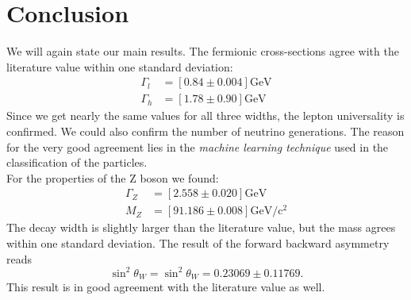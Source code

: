 \section{Conclusion}
We will again state our main results.
The fermionic cross-sections agree with the literature value within one standard deviation:
\begin{align*}
    \Gamma_l &=  \left[ 0.84 \pm 0.004 \right]\mathrm{GeV}\\ 
    \Gamma_h &=  \left[ 1.78 \pm 0.90 \right] \mathrm{GeV}
\end{align*}
Since we get nearly the same values for all three widths, the lepton universality is confirmed. We could also
confirm the number of neutrino generations.
The reason for the very good agreement lies in the \textit{machine learning technique} used in the classification
of the particles. \\
For the properties of the Z boson we found:
\begin{align*}
    \Gamma_Z  &= \left[ 2.558 \pm 0.020 \right] \mathrm{GeV}\\
    M_Z &= \left[ 91.186 \pm 0.008 \right] \mathrm{GeV / c^2} 
\end{align*}
The decay width is slightly larger than the literature value, but the mass agrees within one standard deviation.
The result of the forward backward asymmetry reads
\begin{equation*}
   \sin^2 \theta_W = \sin^2\theta_W = 0.23069 \pm 0.11769.
\end{equation*}
This result is in good agreement with the literature value as well.

